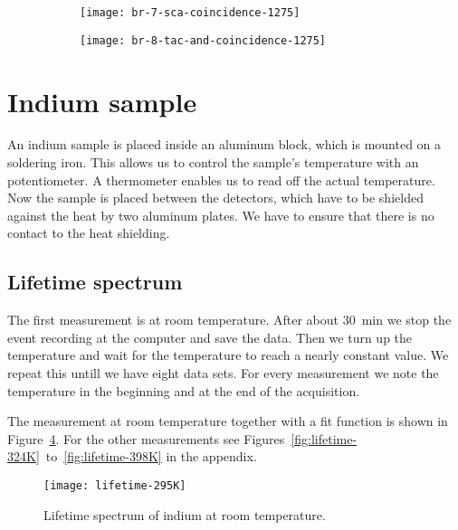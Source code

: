 \documentclass[11pt, english, fleqn, DIV=15, headinclude, BCOR=2cm]{scrreprt}
\begin{document}
\begin{figure}
    \centering
    \begin{subfigure}[c]{0.48\linewidth}
        \centering
        \texttt{[image: br-7-sca-coincidence-1275]}
        \caption{%
        }
        \label{fig:7-sca-coincidence-1275}
    \end{subfigure}
    \hfill
    \begin{subfigure}[c]{0.48\linewidth}
        \centering
        \texttt{[image: br-8-tac-and-coincidence-1275]}
        \caption{%
        }
        \label{fig:8-tac-and-coincidence-1275}
    \end{subfigure}
    \caption{%
    }
    \label{fig:}
\end{figure}

\section{Indium sample}

An indium sample is placed inside an aluminum block, which is mounted on a
soldering iron. This allows us to control the sample's temperature with an
potentiometer. A thermometer enables us to read off the actual temperature. Now
the sample is placed between the detectors, which have to be shielded against
the heat by two aluminum plates. We have to ensure that there is no contact to
the heat shielding. 

\subsection{Lifetime spectrum}

The first measurement is at room temperature. After about \SI{30}{\minute} we
stop the event recording at the computer and save the data. Then we turn up the
temperature and wait for the temperature to reach a nearly
constant value. We repeat this untill we have eight data sets. For every
measurement we note the temperature in the beginning and at the end of the
acquisition.

The measurement at room temperature together with a fit function is shown in
Figure~\ref{fig:lifetime-295K}. For the other measurements see
Figures~\ref{fig:lifetime-324K}~to~\ref{fig:lifetime-398K} in the appendix.

\begin{figure}
    \centering
    \texttt{[image: lifetime-295K]}
    \caption{%
        Lifetime spectrum of indium at room temperature.
    }
    \label{fig:lifetime-295K}
\end{figure}
\end{document}

